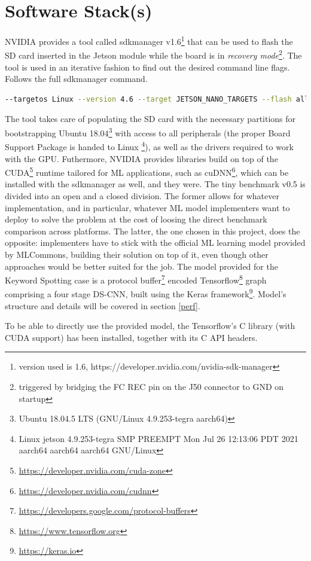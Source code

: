 \documentclass{article}
\begin{document}
\section{Software Stack(s)}\label{sws}
NVIDIA provides a tool called sdkmanager v1.6\footnote{version used is 1.6, https://developer.nvidia.com/nvidia-sdk-manager} that can be used to flash the SD card inserted in the Jetson module while the board is in \textit{recovery mode}\footnote{triggered by bridging the FC REC pin on the J50 connector to GND on startup}. The tool is used in an iterative fashion to find out the desired command line flags. Follows the full sdkmanager command.
\begin{lstlisting}[language=bash]
% sdkmanager --cli install  --logintype devzone --product Jetson \
--targetos Linux --version 4.6 --target JETSON_NANO_TARGETS --flash all
\end{lstlisting}
The tool takes care of populating the SD card with the necessary partitions for bootstrapping Ubuntu 18.04\footnote{Ubuntu 18.04.5 LTS (GNU/Linux 4.9.253-tegra aarch64)} with access to all peripherals (the proper Board Support Package is handed to Linux \footnote{Linux jetson 4.9.253-tegra SMP PREEMPT Mon Jul 26 12:13:06 PDT 2021 aarch64 aarch64 aarch64 GNU/Linux}), as well as the drivers required to work with the GPU. Futhermore, NVIDIA provides libraries build on top of the CUDA\footnote{\url{https://developer.nvidia.com/cuda-zone}} runtime tailored for ML applications, such as cuDNN\footnote{\url{https://developer.nvidia.com/cudnn}}, which can be installed with the sdkmanager as well, and they were.
The tiny benchmark v0.5 is divided into an open and a closed division. The former allows for whatever implementation, and in particular, whatever ML model implementers want to deploy to solve the problem at the cost of loosing the direct benchmark comparison across platforms. The latter, the one chosen in this project, does the opposite: implementers have to stick with the official ML learning model provided by MLCommons, building their solution on top of it, even though other approaches would be better suited for the job.
The model provided for the Keyword Spotting case is a protocol buffer\footnote{\url{https://developers.google.com/protocol-buffers}} encoded Tensorflow\footnote{\url{https://www.tensorflow.org}} graph comprising a four stage DS-CNN, built using the Keras framework\footnote{\url{https://keras.io}}. Model's structure and details will be covered in section \ref{perf}.

To be able to directly use the provided model, the Tensorflow's C library (with CUDA support) has been installed, together with its C API headers.
\end{document}
